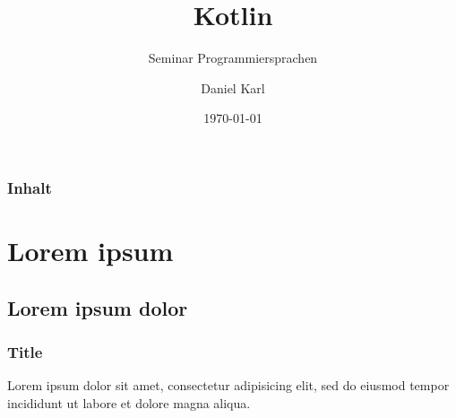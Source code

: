 \documentclass{beamer}
\title{Kotlin}
\subtitle{Seminar Programmiersprachen}
\author{Daniel Karl}
\institute{Universität Siegen}
\date{\today}
\begin{document}
\maketitle


\begin{frame}
\frametitle{Inhalt}
\tableofcontents
\end{frame}

\section{Lorem ipsum}
\subsection{Lorem ipsum dolor}

\begin{frame}
\frametitle{Title}
Lorem ipsum dolor sit amet, consectetur adipisicing elit, sed do eiusmod tempor incididunt ut labore et dolore magna aliqua.
\end{frame}
\end{document}
